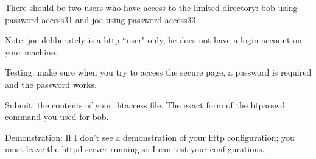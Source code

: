 There should be two users who have access to the {\ltt{}limited}
directory:
{\ltt{}bob} using password {\ltt{}access31}
and 
{\ltt{}joe} using password {\ltt{}access33}.

Note: {\ltt{}joe} deliberately is a http ``user" only,
he does not have a login account on your machine.

Testing: make sure when you try to access the secure page,
a password is required and the password works.

Submit: the contents of your {\ltt{}.htaccess} file.
The exact form of the {\ltt{}htpasswd} command you
used for {\ltt{}bob}.

Demonstration: If I don't see a demonstration of your
http configuration; you must leave the {\ltt{}httpd} server
running so I can test your configurations.

\bye

